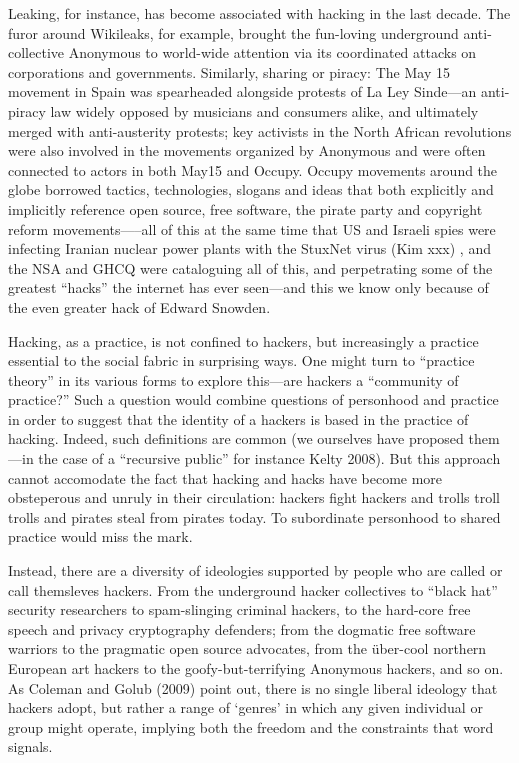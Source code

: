 \documentclass[10pt,letter,oneside]{scrartcl}
\begin{document}
Leaking, for instance, has become associated with hacking in the last decade. The furor around Wikileaks, for example, brought the fun-loving underground anti-collective Anonymous to world-wide attention via its coordinated attacks on corporations and governments.  Similarly, sharing or piracy: The May 15 movement in Spain was spearheaded alongside protests of La Ley Sinde---an anti-piracy law widely opposed by musicians and consumers alike, and ultimately merged with anti-austerity protests; key activists in the North African revolutions were also involved in the movements organized by Anonymous and were often connected to actors in both May15 and Occupy.  Occupy movements around the globe borrowed tactics, technologies, slogans and ideas that both explicitly and implicitly reference open source, free software, the pirate party and copyright reform movements—--all of this at the same time that US and Israeli spies were infecting Iranian nuclear power plants with the StuxNet virus (Kim xxx) , and the NSA and GHCQ were cataloguing all of this, and perpetrating some of the greatest ``hacks'' the internet has ever seen---and this we know only because of the even greater hack of Edward Snowden. 

Hacking, as a practice, is not confined to hackers, but increasingly a practice essential to the social fabric in surprising ways.  One might turn to ``practice theory'' in its various forms to explore this---are hackers a ``community of practice?''  Such a question would combine questions of personhood and practice in order to suggest that the identity of a hackers is based in the practice of hacking.  Indeed, such definitions are common (we ourselves have proposed them---in the case of a ``recursive public'' for instance Kelty 2008).  But this approach cannot accomodate the fact that hacking and hacks have become more obsteperous and unruly in their circulation: hackers fight hackers and trolls troll trolls and pirates steal from pirates today.  To subordinate personhood to shared practice would miss the mark. 

Instead, there are a diversity of ideologies supported by people who are called or call themsleves hackers. From the underground hacker collectives to ``black hat'' security researchers to spam-slinging criminal hackers, to the hard-core free speech and privacy cryptography defenders; from the dogmatic free software warriors to the pragmatic open source advocates, from the über-cool northern European art hackers to the goofy-but-terrifying Anonymous hackers, and so on.   As Coleman and Golub (2009) point out, there is no single liberal ideology that hackers adopt, but rather a range of ‘genres’ in which any given individual or group might operate, implying both the freedom and the constraints that word signals.
\end{document}
